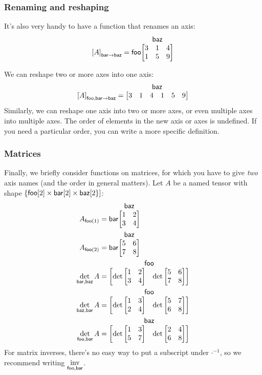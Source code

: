 \documentclass{article}
\makeatletter
\newcommand{\nmatrix}[3]{\name{#1}\begin{array}[b]{@{}c@{}}\name{#2}\\\begin{bmatrix}#3\end{bmatrix}\end{array}}
\makeatother
\begin{document}
\subsubsection{Renaming and reshaping}
\label{sec:reshaping}

It's also very handy to have a function that renames an axis:
\begin{equation*}
\nmov{bar}{baz}{A} = \nmatrix{foo}{baz}{
  3 & 1 & 4 \\
  1 & 5 & 9
}
\end{equation*}

We can reshape two or more axes into one axis:
\begin{equation*}
  \nmov{foo,bar}{baz}{A} = \nmatrix{}{baz}{
    3 & 1 & 4 & 1 & 5 & 9
  }
\end{equation*}
Similarly, we can reshape one axis into two or more axes, or even multiple axes into multiple axes.
The order of elements in the new axis or axes is undefined. If you need a particular order, you can write a more specific definition.

\subsubsection{Matrices}

Finally, we briefly consider functions on matrices, for which you have to give \emph{two} axis names (and the order in general matters). Let $A$ be a named tensor with shape $\{\nset{foo}{2} \times\nset{bar}{2} \times\nset{baz}{2\}}$:
\begin{align*}
A_{\nidx{foo}{1}} &= \nmatrix{bar}{baz}{
  1 & 2 \\
  3 & 4
} \\
A_{\nidx{foo}{2}} &= \nmatrix{bar}{baz}{
  5 & 6 \\
  7 & 8
} \\
\nfun{bar,baz}{det} A &= \nmatrix{}{foo}{\det \begin{bmatrix} 1 & 2 \\ 3 & 4 \end{bmatrix} & \det \begin{bmatrix} 5 & 6 \\ 7 & 8 \end{bmatrix}} \\
\nfun{baz,bar}{det} A &= \nmatrix{}{foo}{\det \begin{bmatrix} 1 & 3 \\ 2 & 4 \end{bmatrix} & \det \begin{bmatrix} 5 & 7 \\ 6 & 8 \end{bmatrix}} \\
\nfun{foo,bar}{det} A &= \nmatrix{}{baz}{\det \begin{bmatrix} 1 & 3 \\ 5 & 7 \end{bmatrix} & \det \begin{bmatrix} 2 & 4 \\ 6 & 8 \end{bmatrix}}
\end{align*}
For matrix inverses, there's no easy way to put a subscript under $\mathord\cdot^{-1}$, so we recommend writing $\nfun{foo,bar}{inv}$.
\end{document}
